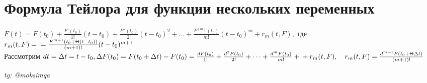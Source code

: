 \documentclass[../main.tex]{subfiles}
\begin{document}
\section{Формула Тейлора для функции нескольких переменных}
\noindent$F(t) = F(t_{0})+ \frac{F'(t_{0})}{1!}(t-t_{0})+ \frac{F''(t_{0})}{2!}(t-t_{0})^{2}+\dots + \frac{F^{(m)}(t_{0})}{m!}(t-t_{0})^{m} + r_{m}(t,F),$ где $r_{m}(t,F) =  \\ = \frac{F^{m+1}(t_{0}+\Theta(t-t_{0}))}{(m+1)!}(t-t_{0})^{m+1}$\\ 
Рассмотрим $dt = \Delta t  = t -t_{0}, \Delta F(t_{0}) = F(t_{0}+\Delta t) - F(t_{0}) = \frac{dF(t_{0})}{1!} + \frac{d^{2}F(t_{0})}{2!} + \dots + \frac{d^{m}F(t_{0})}{m!} +\\+ r_{m}(t,F), \quad r_{m}(t,F) = \frac{d^{m+1}F(t_{0}+\Theta \Delta t)}{(m+1)!}$


\vspace{1cm}
\begin{flushright}
    \textit{tg: @moksimqa}
\end{flushright}
\end{document}
